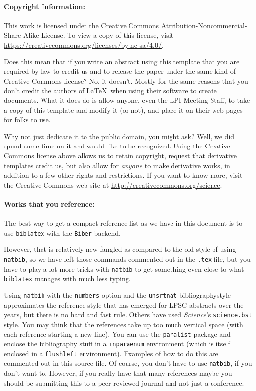 \documentclass[twoside]{article}
\begin{document}
\paragraph{Copyright Information:}

This work is licensed under the Creative Commons
Attribution-Noncommercial-Share Alike License. To view a copy
of this license, visit \url{https://creativecommons.org/licenses/by-nc-sa/4.0/}.

Does this mean that if you write an abstract using this template that
you are required by law to credit us and to release the paper under
the same kind of Creative Commons license?  No, it doesn't.  Mostly
for the same reasons that you don't credit the authors of \LaTeX\
when using their software to create documents.  What it does do is allow
anyone, even the LPI Meeting Staff, to take a copy of this template
and modify it (or not), and place it on their web pages for folks
to use.

Why not just dedicate it to the public domain, you might ask?  Well,
we did spend some time on it and would like to be recognized.  Using
the Creative Commons license above allows us to retain copyright,
request that derivative templates credit us, but also allow for
\emph{anyone} to make derivative works, in addition to a few other
rights and restrictions.  If you want to know more, visit the
Creative Commons web site at \url{http://creativecommons.org/science}.


\paragraph{Works that you reference:}

The best way to get a compact reference list as we have in this
document is to use \texttt{biblatex} with the \texttt{Biber} backend.

However, that is relatively new-fangled as compared to the old style
of using \texttt{natbib}, so we have left those commands commented
out in the \texttt{.tex} file, but you have to play a lot more tricks
with \texttt{natbib} to get something even close to what \texttt{biblatex}
manages with much less typing.

Using \texttt{natbib} with the \texttt{numbers} option and the
\texttt{unsrtnat} bibliographystyle approximates the reference-style
that has emerged for LPSC abstracts over the years, but there is
no hard and fast rule.  Others have used \emph{Science}'s
\texttt{science.bst} style. You may think that the references take
up too much vertical space (with each reference starting a new
line).  You can use the \texttt{paralist} package and enclose the
bibliography stuff in a \texttt{inparaenum} environment (which is
itself enclosed in a \texttt{flushleft} environment).  Examples of
how to do this are commented out in this source file.  Of course,
you don't have to use \texttt{natbib}, if you don't want to.  However,
if you really have that many references maybe you should be submitting
this to a peer-reviewed journal and not just a conference.
\end{document}
